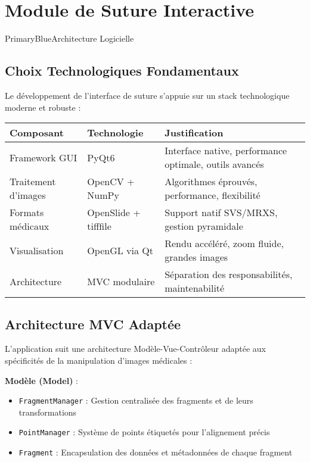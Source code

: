 \documentclass[11pt,a4paper]{article}
\begin{document}
\section{Module de Suture Interactive}

\begin{sectionbox}{PrimaryBlue}{Architecture Logicielle}

\subsection{Choix Technologiques Fondamentaux}

Le développement de l'interface de suture s'appuie sur un stack technologique moderne et robuste :

\begin{center}
\begin{tabular}{|l|l|p{6cm}|}
\hline
\rowcolor{LightGray}
\textbf{Composant} & \textbf{Technologie} & \textbf{Justification} \\
\hline
Framework GUI & PyQt6 & Interface native, performance optimale, outils avancés \\
\hline
Traitement d'images & OpenCV + NumPy & Algorithmes éprouvés, performance, flexibilité \\
\hline
Formats médicaux & OpenSlide + tifffile & Support natif SVS/MRXS, gestion pyramidale \\
\hline
Visualisation & OpenGL via Qt & Rendu accéléré, zoom fluide, grandes images \\
\hline
Architecture & MVC modulaire & Séparation des responsabilités, maintenabilité \\
\hline
\end{tabular}
\end{center}

\subsection{Architecture MVC Adaptée}

L'application suit une architecture Modèle-Vue-Contrôleur adaptée aux spécificités de la manipulation d'images médicales :

\textbf{Modèle (Model)} :
\begin{itemize}[leftmargin=*]
    \item \texttt{FragmentManager} : Gestion centralisée des fragments et de leurs transformations
    \item \texttt{PointManager} : Système de points étiquetés pour l'alignement précis
    \item \texttt{Fragment} : Encapsulation des données et métadonnées de chaque fragment
\end{itemize}


\end{sectionbox}
\end{document}
